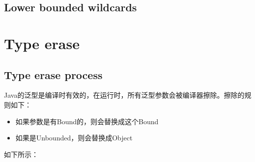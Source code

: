 \documentclass[12pt]{article}
\begin{document}
\subsection{Lower bounded wildcards}\label{lower-bounded-wildcards}

\begin{Shaded}
\begin{Highlighting}[]
   \OperatorTok{(}  \OperatorTok{\textgreater{}}\OperatorTok{)} \OperatorTok{\{}
     \OperatorTok{(}\OperatorTok{=} \OperatorTok{;}\OperatorTok{\textless{}=} \OperatorTok{;}\OperatorTok{++)} \OperatorTok{\{}
\OperatorTok{(}\OperatorTok{);}
\OperatorTok{(}\OperatorTok{);}
    \OperatorTok{\}}
\OperatorTok{\}}
\OperatorTok{(} \OperatorTok{\textless{}}\OperatorTok{\textgreater{}());}
\end{Highlighting}
\end{Shaded}

\section{Type erase}\label{type-erase}

\subsection{Type erase process}\label{type-erase-process}

Java的泛型是编译时有效的，在运行时，所有泛型参数会被编译器擦除。擦除的规则如下：

\begin{itemize}
\tightlist
\item
  如果参数是有Bound的，则会替换成这个Bound
\item
  如果是Unbounded，则会替换成Object
\end{itemize}

如下所示：
\end{document}
